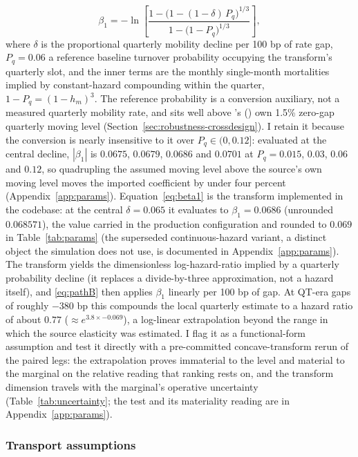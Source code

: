 \documentclass[12pt]{article}
\newcommand{\citepos}[1]{\citeauthor{#1}'s (\citeyear{#1})}
\begin{document}
\begin{equation}\label{eq:beta1}
\beta_1 = -\ln\!\left[\frac{1-\big(1-(1-\delta)\,P_q\big)^{1/3}}{1-\big(1-P_q\big)^{1/3}}\right],
\end{equation}
where $\delta$ is the proportional quarterly mobility decline per 100 bp of rate gap, $P_q = 0.06$ a reference baseline turnover probability occupying the transform's quarterly slot, and the inner terms are the monthly single-month mortalities implied by constant-hazard compounding within the quarter, $1 - P_q = (1 - h_m)^3$. The reference probability is a conversion auxiliary, not a measured quarterly mobility rate, and sits well above \citepos{liebersohn2024} own 1.5\% zero-gap quarterly moving level (Section~\ref{sec:robustness-crossdesign}). I retain it because the conversion is nearly insensitive to it over $P_q \in (0, 0.12]$: evaluated at the central decline, $|\beta_1|$ is $0.0675$, $0.0679$, $0.0686$ and $0.0701$ at $P_q = 0.015$, $0.03$, $0.06$ and $0.12$, so quadrupling the assumed moving level above the source's own moving level moves the imported coefficient by under four percent (Appendix~\ref{app:params}). Equation~\eqref{eq:beta1} is the transform implemented in the codebase: at the central $\delta = 0.065$ it evaluates to $\beta_1 = 0.0686$ (unrounded $0.068571$), the value carried in the production configuration and rounded to $0.069$ in Table~\ref{tab:params} (the superseded continuous-hazard variant, a distinct object the simulation does not use, is documented in Appendix~\ref{app:params}). The transform yields the dimensionless log-hazard-ratio implied by a quarterly probability decline (it replaces a divide-by-three approximation, not a hazard itself), and \eqref{eq:pathB} then applies $\beta_1$ linearly per 100 bp of gap. At QT-era gaps of roughly $-380$ bp this compounds the local quarterly estimate to a hazard ratio of about $0.77$ ($\approx e^{3.8 \times -0.069}$), a log-linear extrapolation beyond the range in which the source elasticity was estimated. I flag it as a functional-form assumption and test it directly with a pre-committed concave-transform rerun of the paired legs: the extrapolation proves immaterial to the level and material to the marginal on the relative reading that ranking rests on, and the transform dimension travels with the marginal's operative uncertainty (Table~\ref{tab:uncertainty}; the test and its materiality reading are in Appendix~\ref{app:params}).

\subsubsection{Transport assumptions}
\end{document}
